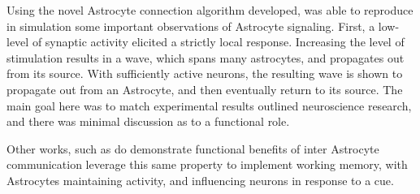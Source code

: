     Using the novel Astrocyte connection algorithm developed,
    \parencite{postnov_2009} was able to reproduce in simulation some important
    observations of Astrocyte signaling. First, a low-level of synaptic
    activity elicited a strictly local response. Increasing the level of
    stimulation results in a \ca wave, which spans many astrocytes, and
    propagates out from its source. With sufficiently active neurons, the
    resulting \ca wave is shown to propagate out from an Astrocyte, and then
    eventually return to its source. The main goal here was to match
    experimental results outlined neuroscience research, and there was minimal
    discussion as to a functional role.

    Other works, such as \parencite{gordleeva_2021} do demonstrate functional
    benefits of inter Astrocyte communication leverage this same property to
    implement working memory, with Astrocytes maintaining \ca activity, and
    influencing neurons in response to a cue.

    
    
    
